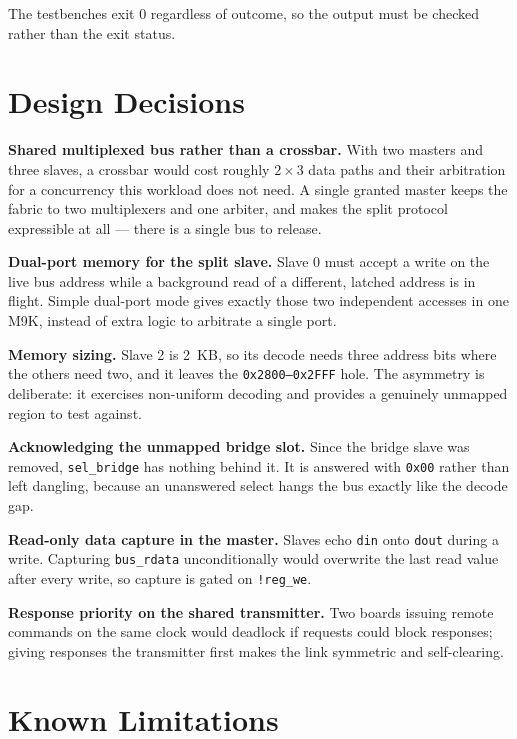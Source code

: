 \documentclass[11pt,a4paper]{article}
\newcommand{\sig}[1]{\texttt{#1}}
\begin{document}
The testbenches exit 0 regardless of outcome, so the output must be checked
rather than the exit status.

\section{Design Decisions}

\textbf{Shared multiplexed bus rather than a crossbar.} With two masters and
three slaves, a crossbar would cost roughly $2\times3$ data paths and their
arbitration for a concurrency this workload does not need. A single granted
master keeps the fabric to two multiplexers and one arbiter, and makes the split
protocol expressible at all --- there is a single bus to release.

\textbf{Dual-port memory for the split slave.} Slave 0 must accept a write on
the live bus address while a background read of a different, latched address is
in flight. Simple dual-port mode gives exactly those two independent accesses in
one M9K, instead of extra logic to arbitrate a single port.

\textbf{Memory sizing.} Slave 2 is 2~KB, so its decode needs three address bits
where the others need two, and it leaves the \texttt{0x2800--0x2FFF} hole. The
asymmetry is deliberate: it exercises non-uniform decoding and provides a
genuinely unmapped region to test against.

\textbf{Acknowledging the unmapped bridge slot.} Since the bridge slave was
removed, \sig{sel\_bridge} has nothing behind it. It is answered with \sig{0x00}
rather than left dangling, because an unanswered select hangs the bus exactly
like the decode gap.

\textbf{Read-only data capture in the master.} Slaves echo \sig{din} onto
\sig{dout} during a write. Capturing \sig{bus\_rdata} unconditionally would
overwrite the last read value after every write, so capture is gated on
\sig{!reg\_we}.

\textbf{Response priority on the shared transmitter.} Two boards issuing remote
commands on the same clock would deadlock if requests could block responses;
giving responses the transmitter first makes the link symmetric and
self-clearing.

\section{Known Limitations}
\label{sec:limits}
\end{document}
